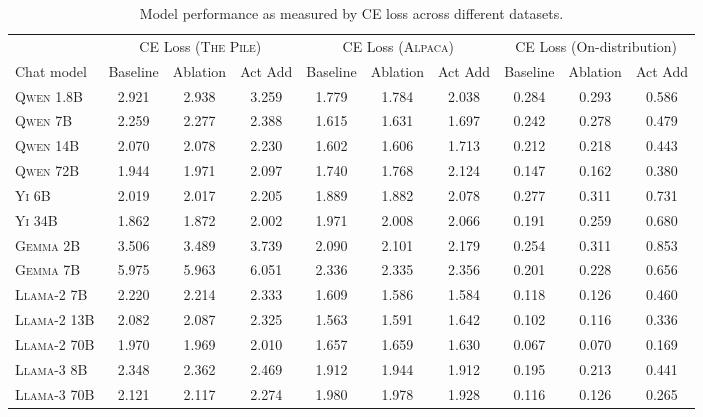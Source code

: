 \documentclass{article}
\begin{document}
\label{apdx:sub:ce_loss_eval}
\begin{table}[t]
\scriptsize
\caption{Model performance as measured by CE loss across different datasets.}
\label{tab:model_performance}
\centering
\begin{tabular}{l ccc ccc ccc}
\toprule
 & \multicolumn{3}{c}{CE Loss (\textsc{The Pile})} & \multicolumn{3}{c}{CE Loss (\textsc{Alpaca})} & \multicolumn{3}{c}{CE Loss (On-distribution)} \\
\cmidrule(lr){2-4} \cmidrule(lr){5-7} \cmidrule(lr){8-10}
Chat model & Baseline & Ablation & Act Add & Baseline & Ablation & Act Add & Baseline & Ablation & Act Add \\
\midrule
\textsc{Qwen 1.8B} & 2.921 & 2.938 & 3.259 & 1.779 & 1.784 & 2.038 & 0.284 & 0.293 & 0.586 \\
\textsc{Qwen 7B} & 2.259 & 2.277 & 2.388 & 1.615 & 1.631 & 1.697 & 0.242 & 0.278 & 0.479 \\
\textsc{Qwen 14B} & 2.070 & 2.078 & 2.230 & 1.602 & 1.606 & 1.713 & 0.212 & 0.218 & 0.443 \\
\textsc{Qwen 72B} & 1.944 & 1.971 & 2.097 & 1.740 & 1.768 & 2.124 & 0.147 & 0.162 & 0.380 \\
\textsc{Yi 6B} & 2.019 & 2.017 & 2.205 & 1.889 & 1.882 & 2.078 & 0.277 & 0.311 & 0.731 \\
\textsc{Yi 34B} & 1.862 & 1.872 & 2.002 & 1.971 & 2.008 & 2.066 & 0.191 & 0.259 & 0.680 \\
\textsc{Gemma 2B} & 3.506 & 3.489 & 3.739 & 2.090 & 2.101 & 2.179 & 0.254 & 0.311 & 0.853 \\
\textsc{Gemma 7B} & 5.975 & 5.963 & 6.051 & 2.336 & 2.335 & 2.356 & 0.201 & 0.228 & 0.656 \\
\textsc{Llama-2 7B} & 2.220 & 2.214 & 2.333 & 1.609 & 1.586 & 1.584 & 0.118 & 0.126 & 0.460 \\
\textsc{Llama-2 13B} & 2.082 & 2.087 & 2.325 & 1.563 & 1.591 & 1.642 & 0.102 & 0.116 & 0.336 \\
\textsc{Llama-2 70B} & 1.970 & 1.969 & 2.010 & 1.657 & 1.659 & 1.630 & 0.067 & 0.070 & 0.169 \\
\textsc{Llama-3 8B} & 2.348 & 2.362 & 2.469 & 1.912 & 1.944 & 1.912 & 0.195 & 0.213 & 0.441 \\
\textsc{Llama-3 70B} & 2.121 & 2.117 & 2.274 & 1.980 & 1.978 & 1.928 & 0.116 & 0.126 & 0.265 \\
\bottomrule
\end{tabular}
\end{table}
\end{document}

